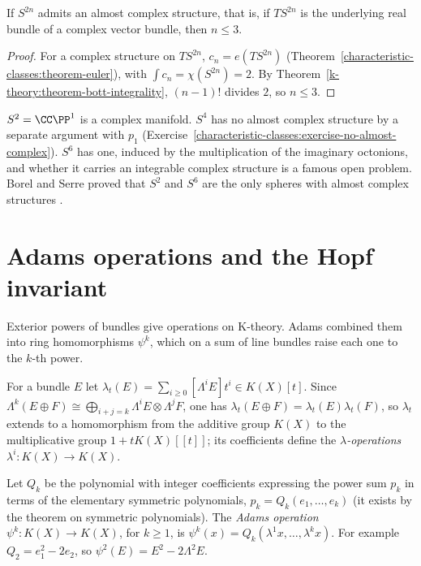 \begin{corollary}\label{k-theory:corollary-almost-complex-spheres}
If $S^{2n}$ admits an almost complex structure, that is, if $TS^{2n}$ is the underlying real bundle of a complex vector bundle, then $n \leq 3$.
\end{corollary}

\begin{proof}
For a complex structure on $TS^{2n}$, $c_n = e(TS^{2n})$ (Theorem~\ref{characteristic-classes:theorem-euler}), with $\int c_n = \chi(S^{2n}) = 2$. By Theorem~\ref{k-theory:theorem-bott-integrality},
$(n - 1)!$ divides $2$, so $n \leq 3$.
\end{proof}

\begin{remark}\label{k-theory:remark-almost-complex-spheres}
$S^2 = \CC\PP^1$ is a complex manifold. $S^4$ has no almost complex structure by a separate argument with $p_1$ (Exercise~\ref{characteristic-classes:exercise-no-almost-complex}). $S^6$ has one, induced by
the multiplication of the imaginary octonions, and whether it carries an integrable complex structure is a famous open problem. Borel and Serre proved that $S^2$ and $S^6$ are the only spheres with almost
complex structures \cite{borel-serre-1953}.
\end{remark}

\section{Adams operations and the Hopf invariant}\label{k-theory:section-adams-operations}

Exterior powers of bundles give operations on K-theory. Adams combined them into ring homomorphisms $\psi^k$, which on a sum of line bundles raise each one to the $k$-th power.

\begin{definition}\label{k-theory:definition-lambda}
For a bundle $E$ let $\lambda_t(E) = \sum_{i \geq 0}[\Lambda^iE]t^i \in K(X)[t]$. Since $\Lambda^k(E \oplus F) \cong \bigoplus_{i+j=k}\Lambda^iE \otimes \Lambda^jF$, one has $\lambda_t(E \oplus F) = \lambda_t(E)\lambda_t(F)$, so
$\lambda_t$ extends to a homomorphism from the additive group $K(X)$ to the multiplicative group $1 + tK(X)[[t]]$; its coefficients define the \emph{$\lambda$-operations} $\lambda^i \colon K(X) \to K(X)$.
\end{definition}

\begin{definition}\label{k-theory:definition-adams-operations}
Let $Q_k$ be the polynomial with integer coefficients expressing the power sum $p_k$ in terms of the elementary symmetric polynomials, $p_k = Q_k(e_1, \ldots, e_k)$ (it exists by the theorem on symmetric
polynomials). The \emph{Adams operation} $\psi^k \colon K(X) \to K(X)$, for $k \geq 1$, is $\psi^k(x) = Q_k(\lambda^1x, \ldots, \lambda^kx)$. For example $Q_2 = e_1^2 - 2e_2$, so $\psi^2(E) = E^2 - 2\Lambda^2E$.
\end{definition}


